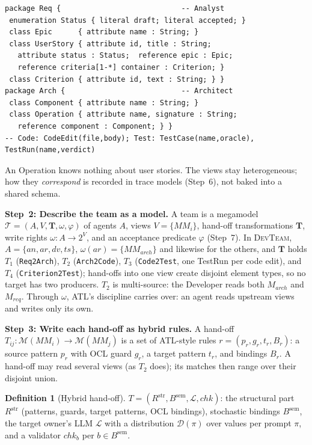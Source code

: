 \documentclass[10pt,conference]{IEEEtran}
\theoremstyle{definition}
\newtheorem{definition}{Definition}
\newcommand{\devteam}{\textsc{DevTeam}}
\newcommand{\MM}{\mathit{MM}}
\newcommand{\Mods}[1]{\mathcal{M}(#1)}
\newcommand{\team}{\mathcal{T}}
\newcommand{\str}{\mathrm{str}}
\newcommand{\sem}{\mathrm{sem}}
\newcommand{\Dist}[1]{\mathcal{D}(#1)}
\newcommand{\cls}[1]{\textsf{#1}}
\newcommand{\code}[1]{\texttt{#1}}
\begin{document}
\begin{lstlisting}[language=KM3, float=t,
  caption={View metamodels of the \devteam{} agents.},
  label={lst:views}]
package Req {                            -- Analyst
 enumeration Status { literal draft; literal accepted; }
 class Epic      { attribute name : String; }
 class UserStory { attribute id, title : String;
   attribute status : Status;  reference epic : Epic;
   reference criteria[1-*] container : Criterion; }
 class Criterion { attribute id, text : String; } }
package Arch {                           -- Architect
 class Component { attribute name : String; }
 class Operation { attribute name, signature : String;
   reference component : Component; } }
-- Code: CodeEdit(file,body); Test: TestCase(name,oracle), TestRun(name,verdict)
\end{lstlisting}

\noindent An \cls{Operation} knows nothing about user stories. The views
stay heterogeneous; how they \emph{correspond} is recorded in trace models
(Step~6), not baked into a shared schema.

\smallskip\noindent\textbf{Step~2: Describe the team as a model.} A team is
a megamodel $\team=(A,V,\mathbf{T},\omega,\varphi)$ of agents $A$, views
$V=\{\MM_i\}$, hand-off transformations $\mathbf{T}$, write rights
$\omega:A\to 2^{V}$, and an acceptance predicate $\varphi$ (Step~7). In
\devteam{}, $A=\{\mathit{an},\mathit{ar},\mathit{dv},\mathit{ts}\}$,
$\omega(\mathit{ar})=\{\MM_{\mathit{arch}}\}$ and likewise for the others,
and $\mathbf{T}$ holds $T_1$ (\code{Req2Arch}), $T_2$ (\code{Arch2Code}),
$T_3$ (\code{Code2Test}, one \cls{TestRun} per code edit), and $T_4$
(\code{Criterion2Test}); hand-offs into one view create disjoint element
types, so no target has two producers. $T_2$ is multi-source: the Developer reads both
$M_{\mathit{arch}}$ and $M_{\mathit{req}}$. Through $\omega$, ATL's
discipline carries over: an agent reads upstream views and writes only its
own.

\smallskip\noindent\textbf{Step~3: Write each hand-off as hybrid rules.} A
hand-off $T_{ij}:\Mods{\MM_i}\to\Mods{\MM_j}$ is a set of ATL-style rules
$r=(p_r,g_r,t_r,B_r)$: a source pattern $p_r$ with OCL guard $g_r$, a
target pattern $t_r$, and bindings $B_r$. A hand-off may read several views
(as $T_2$ does); its matches then range over their disjoint union.

\begin{definition}[Hybrid hand-off]\label{def:hybrid}
$T=(R^{\str},B^{\sem},\mathcal{L},\mathit{chk})$: the structural part
$R^{\str}$ (patterns, guards, target patterns, OCL bindings), stochastic
bindings $B^{\sem}$, the target owner's LLM $\mathcal{L}$ with a
distribution $\Dist{\pi}$ over values per prompt $\pi$, and a validator
$\mathit{chk}_b$ per $b\in B^{\sem}$.
\end{definition}
\end{document}
